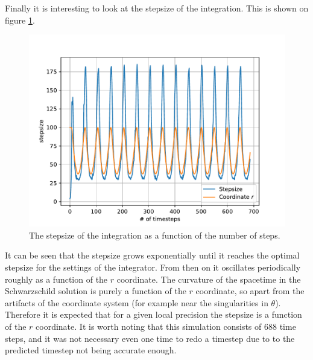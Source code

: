 \documentclass[pdftex,12pt,a4paper]{article}
\begin{document}
		Finally it is interesting to look at the stepsize of the integration. This is shown on figure \ref{stepsize}.
		\begin{figure}[H]
			\centering
			\includegraphics[scale=1]{./figs/planetStepsize.pdf}
			\caption{The stepsize of the integration as a function of the number of steps.}
			\label{stepsize}
		\end{figure}
		It can be seen that the stepsize grows exponentially until it reaches the optimal stepsize for the settings of the integrator. From then on it oscillates periodically roughly as a function of the $r$ coordinate. The curvature of the spacetime in the Schwarzschild solution is purely a function of the $r$ coordinate, so apart from the artifacts of the coordinate system (for example near the singularities in $\theta$). Therefore it is expected that for a given local precision the stepsize is a function of the $r$ coordinate. It is worth noting that this simulation consists of 688 time steps, and it was not necessary even one time to redo a timestep due to to the predicted timestep not being accurate enough.
\end{document}
